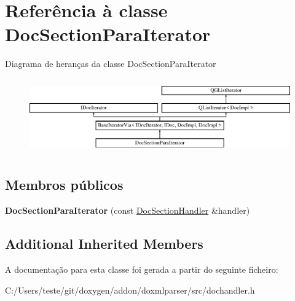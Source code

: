 \hypertarget{class_doc_section_para_iterator}{\section{Referência à classe Doc\-Section\-Para\-Iterator}
\label{class_doc_section_para_iterator}
}
Diagrama de heranças da classe Doc\-Section\-Para\-Iterator\begin{figure}[H]
\begin{center}
\leavevmode
\includegraphics[height=3.294118cm]{class_doc_section_para_iterator}
\end{center}
\end{figure}
\subsection*{Membros públicos}
\begin{DoxyCompactItemize}
\item 
\hypertarget{class_doc_section_para_iterator_ab8f8e59c363887e1d1ba3bbcd27d5df6}{{\bfseries Doc\-Section\-Para\-Iterator} (const \hyperlink{class_doc_section_handler}{Doc\-Section\-Handler} \&handler)}\label{class_doc_section_para_iterator_ab8f8e59c363887e1d1ba3bbcd27d5df6}

\end{DoxyCompactItemize}
\subsection*{Additional Inherited Members}


A documentação para esta classe foi gerada a partir do seguinte ficheiro\-:\begin{DoxyCompactItemize}
\item 
C\-:/\-Users/teste/git/doxygen/addon/doxmlparser/src/dochandler.\-h\end{DoxyCompactItemize}
